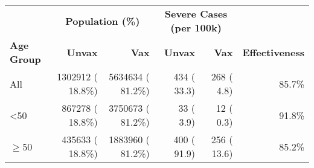 \begin{table}[ht]
\centering
\begin{tabular}{lrrrrr}
  \toprule
  & \multicolumn{2}{c}{\textbf{Population (\%)}} & \multicolumn{2}{c}{\textbf{Severe Cases (per 100k)}} & \\
 \cmidrule(lr){2-3} \cmidrule(lr){4-5}
 \textbf{Age Group} & \textbf{Unvax} & \textbf{Vax} & \textbf{Unvax} & \textbf{Vax} & \textbf{Effectiveness} \\
 \midrule
 All & {\color{steelblue} 1302912} ({\color{steelblue} 18.8\%}) & {\color{steelblue} 5634634} ({\color{steelblue} 81.2\%}) & {\color{pastelred} 434} ({\color{pastelred} 33.3}) & {\color{pastelred} 268} ({\color{pastelred} 4.8}) & {\color{pastelred} 85.7\%} \\
 <50 & {\color{pastelred} 867278} ({\color{pastelred} 18.8\%}) & {\color{pastelred} 3750673} ({\color{pastelred} 81.2\%}) & {\color{pastelred} 33} ({\color{steelblue} 3.9}) & {\color{pastelred} 12} ({\color{steelblue} 0.3}) & {\color{steelblue} 91.8\%} \\
   $\geq$50 & {\color{pastelred} 435633} ({\color{pastelred} 18.8\%}) & {\color{pastelred} 1883960} ({\color{pastelred} 81.2\%}) & {\color{pastelred} 400} ({\color{steelblue} 91.9}) & {\color{pastelred} 256} ({\color{steelblue} 13.6}) & {\color{steelblue} 85.2\%} \\
   \bottomrule
\end{tabular}
\end{table}
